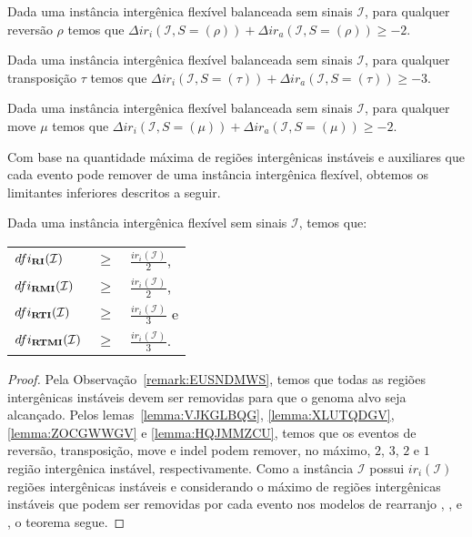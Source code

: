 \begin{lemma}\label{lemma:IERALSKC}
Dada uma instância intergênica flexível balanceada sem sinais $\mathcal{I}$, para qualquer reversão $\rho$ temos que $\Delta ir_i(\mathcal{I}, S = (\rho)) + \Delta ir_a(\mathcal{I}, S = (\rho)) \ge -2$.
\end{lemma}

\begin{lemma}\label{lemma:FOXQSODF}
Dada uma instância intergênica flexível balanceada sem sinais $\mathcal{I}$, para qualquer transposição $\tau$ temos que $\Delta ir_i(\mathcal{I}, S = (\tau)) + \Delta ir_a(\mathcal{I}, S = (\tau)) \ge -3$.
\end{lemma}

\begin{lemma}\label{lemma:AXMNYRLB}
Dada uma instância intergênica flexível balanceada sem sinais $\mathcal{I}$, para qualquer move $\mu$ temos que $\Delta ir_i(\mathcal{I}, S = (\mu)) + \Delta ir_a(\mathcal{I}, S = (\mu)) \ge -2$.
\end{lemma}

Com base na quantidade máxima de regiões intergênicas instáveis e auxiliares que cada evento pode remover de uma instância intergênica flexível, obtemos os  limitantes inferiores descritos a seguir.

\begin{theorem}\label{theorem:BOTBXFZQ}
Dada uma instância intergênica flexível sem sinais $\mathcal{I}$, temos que:

\begin{tabular}{lll}
  $dfi_{\textbf{RI}}(\mathcal{I})$     & $ \ge $ & $\frac{ir_i(\mathcal{I})}{2}$,  \\
  $dfi_{\textbf{RMI}}(\mathcal{I})$    & $ \ge $ & $\frac{ir_i(\mathcal{I})}{2}$,  \\
  $dfi_{\textbf{RTI}}(\mathcal{I})$    & $ \ge $ & $\frac{ir_i(\mathcal{I})}{3}$ e \\
  $dfi_{\textbf{RTMI}}(\mathcal{I})$   & $ \ge $ & $\frac{ir_i(\mathcal{I})}{3}$.  \\
\end{tabular}
\end{theorem}
\begin{proof}
Pela Observação~\ref{remark:EUSNDMWS}, temos que todas as regiões intergênicas instáveis devem ser removidas para que o genoma alvo seja alcançado. Pelos lemas~\ref{lemma:VJKGLBQG}, \ref{lemma:XLUTQDGV}, \ref{lemma:ZOCGWWGV} e \ref{lemma:HQJMMZCU}, temos que os eventos de reversão, transposição, move e indel podem remover, no máximo, $2$, $3$, $2$ e $1$ região intergênica instável, respectivamente. Como a instância $\mathcal{I}$ possui $ir_i(\mathcal{I})$ regiões intergênicas instáveis e considerando o máximo de regiões intergênicas instáveis que podem ser removidas por cada evento nos modelos de rearranjo \RI{}, \RMI{}, \RTI{} e \RTMI{}, o teorema segue.
\end{proof}

